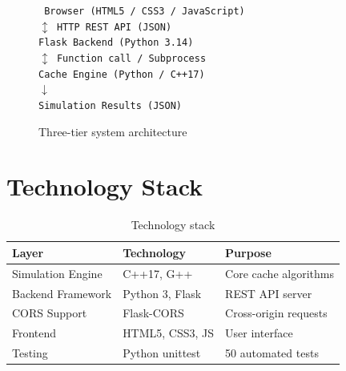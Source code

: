 \documentclass[12pt,a4paper]{report}
\begin{document}
\begin{figure}[H]
\centering
\begin{tcolorbox}[colback=gray!10,colframe=primary!60,title=System Architecture]
\begin{center}
\texttt{
Browser (HTML5 / CSS3 / JavaScript)\\
$\updownarrow$ HTTP REST API (JSON)\\
Flask Backend (Python 3.14)\\
$\updownarrow$ Function call / Subprocess\\
Cache Engine (Python / C++17)\\
$\downarrow$\\
Simulation Results (JSON)
}
\end{center}
\end{tcolorbox}
\caption{Three-tier system architecture}
\end{figure}

\section{Technology Stack}
\begin{table}[H]
\centering
\begin{tabular}{lll}
\toprule
\textbf{Layer} & \textbf{Technology} & \textbf{Purpose} \\
\midrule
Simulation Engine & C++17, G++ & Core cache algorithms \\
Backend Framework & Python 3, Flask & REST API server \\
CORS Support      & Flask-CORS & Cross-origin requests \\
Frontend          & HTML5, CSS3, JS & User interface \\
Testing           & Python unittest & 50 automated tests \\
\bottomrule
\end{tabular}
\caption{Technology stack}
\end{table}
\end{document}
